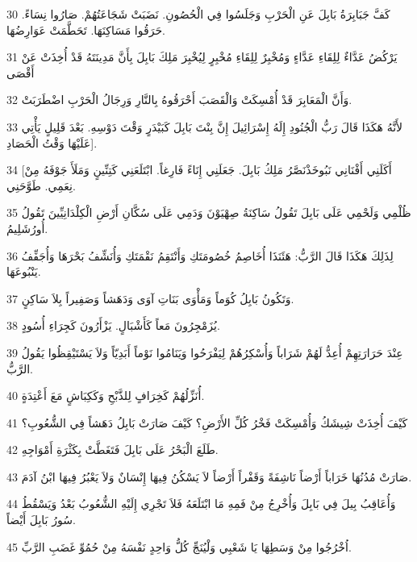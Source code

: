 \par 30 كَفَّ جَبَابِرَةُ بَابِلَ عَنِ الْحَرْبِ وَجَلَسُوا فِي الْحُصُونِ. نَضَبَتْ شَجَاعَتُهُمْ. صَارُوا نِسَاءً. حَرَقُوا مَسَاكِنَهَا. تَحَطَّمَتْ عَوَارِضُهَا.
\par 31 يَرْكُضُ عَدَّاءٌ لِلِقَاءِ عَدَّاءٍ وَمُخْبِرٌ لِلِقَاءِ مُخْبِرٍ لِيُخْبِرَ مَلِكَ بَابِلَ بِأَنَّ مَدِينَتَهُ قَدْ أُخِذَتْ عَنْ أَقْصَى
\par 32 وَأَنَّ الْمَعَابِرَ قَدْ أُمْسِكَتْ وَالْقَصَبَ أَحْرَقُوهُ بِالنَّارِ وَرِجَالُ الْحَرْبِ اضْطَرَبَتْ.
\par 33 لأَنَّهُ هَكَذَا قَالَ رَبُّ الْجُنُودِ إِلَهُ إِسْرَائِيلَ إِنَّ بِنْتَ بَابِلَ كَبَيْدَرٍ وَقْتَ دَوْسِهِ. بَعْدَ قَلِيلٍ يَأْتِي عَلَيْهَا وَقْتُ الْحَصَادِ].
\par 34 [أَكَلَنِي أَفْنَانِي نَبُوخَذْنَصَّرُ مَلِكُ بَابِلَ. جَعَلَنِي إِنَاءً فَارِغاً. ابْتَلَعَنِي كَتِنِّينٍ وَمَلَأَ جَوْفَهُ مِنْ نِعَمِي. طَوَّحَنِي.
\par 35 ظُلْمِي وَلَحْمِي عَلَى بَابِلَ تَقُولُ سَاكِنَةُ صِهْيَوْنَ وَدَمِي عَلَى سُكَّانِ أَرْضِ الْكِلْدَانِيِّينَ تَقُولُ أُورُشَلِيمُ.
\par 36 لِذَلِكَ هَكَذَا قَالَ الرَّبُّ: هَئَنَذَا أُخَاصِمُ خُصُومَتَكِ وَأَنْتَقِمُ نَقْمَتَكِ وَأُنَشِّفُ بَحْرَهَا وَأُجَفِّفُ يَنْبُوعَهَا.
\par 37 وَتَكُونُ بَابِلُ كُوَماً وَمَأْوَى بَنَاتِ آوَى وَدَهَشاً وَصَفِيراً بِلاَ سَاكِنٍ.
\par 38 يُزَمْجِرُونَ مَعاً كَأَشْبَالٍ. يَزْأَرُونَ كَجِرَاءِ أُسُودٍ.
\par 39 عِنْدَ حَرَارَتِهِمْ أُعِدُّ لَهُمْ شَرَاباً وَأُسْكِرُهُمْ لِيَفْرَحُوا وَيَنَامُوا نَوْماً أَبَدِيّاً وَلاَ يَسْتَيْقِظُوا يَقُولُ الرَّبُّ.
\par 40 أُنَزِّلُهُمْ كَخِرَافٍ لِلذَّبْحِ وَكَكِبَاشٍ مَعَ أَعْتِدَةٍ.
\par 41 كَيْفَ أُخِذَتْ شِيشَكُ وَأُمْسِكَتْ فَخْرُ كُلِّ الأَرْضِ؟ كَيْفَ صَارَتْ بَابِلُ دَهَشاً فِي الشُّعُوبِ؟
\par 42 طَلَعَ الْبَحْرُ عَلَى بَابِلَ فَتَغَطَّتْ بِكَثْرَةِ أَمْوَاجِهِ.
\par 43 صَارَتْ مُدُنُهَا خَرَاباً أَرْضاً نَاشِفَةً وَقَفْراً أَرْضاً لاَ يَسْكُنُ فِيهَا إِنْسَانٌ وَلاَ يَعْبُرُ فِيهَا ابْنُ آدَمَ.
\par 44 وَأُعَاقِبُ بِيلَ فِي بَابِلَ وَأُخْرِجُ مِنْ فَمِهِ مَا ابْتَلَعَهُ فَلاَ تَجْرِي إِلَيْهِ الشُّعُوبُ بَعْدُ وَيَسْقُطُ سُورُ بَابِلَ أَيْضاً.
\par 45 اُخْرُجُوا مِنْ وَسَطِهَا يَا شَعْبِي وَلْيُنَجِّ كُلُّ وَاحِدٍ نَفْسَهُ مِنْ حُمُوِّ غَضَبِ الرَّبِّ.
